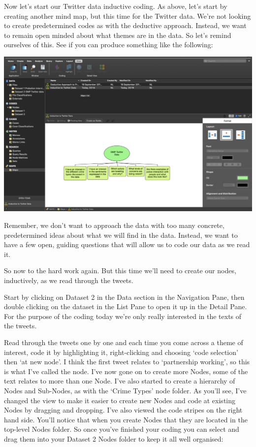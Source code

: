 \documentclass[
]{book}
\begin{document}
Now let's start our Twitter data inductive coding. As above, let's start by creating another mind map, but this time for the Twitter data. We're not looking to create predetermined codes as with the deductive approach. Instead, we want to remain open minded about what themes are in the data. So let's remind ourselves of this. See if you can produce something like the following:

\includegraphics{imgs/inductive_map.png}

Remember, we don't want to approach the data with too many concrete, predetermined ideas about what we will find in the data. Instead, we want to have a few open, guiding questions that will allow us to code our data as we read it.

So now to the hard work again. But this time we'll need to create our nodes, inductively, as we read through the tweets.

Start by clicking on Dataset 2 in the Data section in the Navigation Pane, then double clicking on the dataset in the List Pane to open it up in the Detail Pane. For the purpose of the coding today we're only really interested in the texts of the tweets.

Read through the tweets one by one and each time you come across a theme of interest, code it by highlighting it, right-clicking and choosing `code selection' then `at new node'. I think the first tweet relates to `partnership working', so this is what I've called the node. I've now gone on to create more Nodes, some of the text relates to more than one Node. I've also started to create a hierarchy of Nodes and Sub-Nodes, as with the `Crime Types' node folder. As you'll see, I've changed the view to make it easier to create new Nodes and code at existing Nodes by dragging and dropping. I've also viewed the code stripes on the right hand side. You'll notice that when you create Nodes that they are located in the top-level Nodes folder. So once you've finished your coding you can select and drag them into your Dataset 2 Nodes folder to keep it all well organised:
\end{document}
